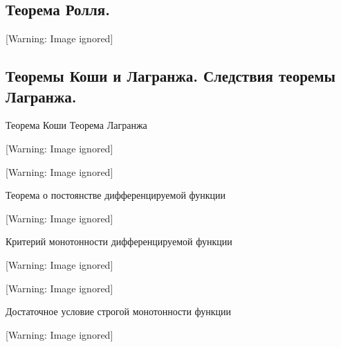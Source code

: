 \documentclass[a4paper]{article}
\begin{document}
\bigskip

\subsection{Теорема Ролля.}
  [Warning: Image ignored] %
 

\subsection{Теоремы Коши и Лагранжа. Следствия теоремы Лагранжа.}
Теорема Коши\newline
Теорема Лагранжа

  [Warning: Image ignored] %
 

  [Warning: Image ignored] %
 

Теорема о постоянстве дифференцируемой функции

  [Warning: Image ignored] %
 

Критерий монотонности дифференцируемой функции

  [Warning: Image ignored] %
 

  [Warning: Image ignored] %
 

Достаточное условие строгой монотонности функции

  [Warning: Image ignored] %
 
\end{document}
